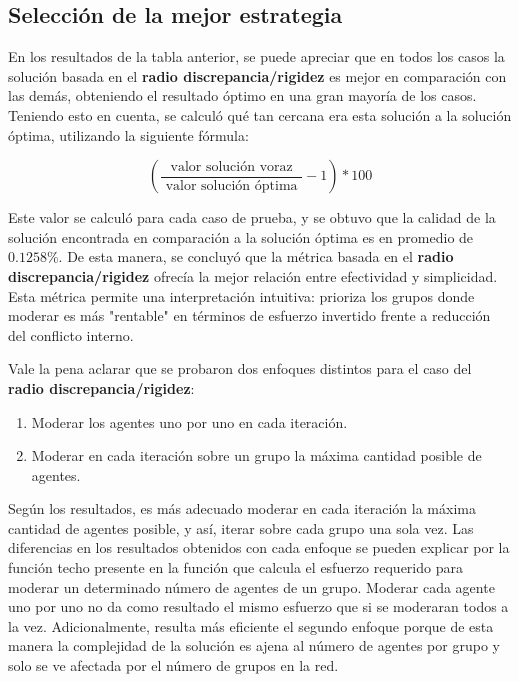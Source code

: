 \subsection{Selección de la mejor estrategia}

En los resultados de la tabla anterior, se puede apreciar que en todos los casos la solución basada en el \textbf{radio discrepancia/rigidez} es mejor en comparación con las demás, obteniendo el resultado óptimo en una gran mayoría de los casos. Teniendo esto en cuenta, se calculó qué tan cercana era esta solución a la solución óptima, utilizando la siguiente fórmula:

\begin{equation}
	\left ( \frac{ \text{ valor solución voraz } }{ \text{ valor solución óptima }} - 1 \right ) * 100
\end{equation}


Este valor se calculó para cada caso de prueba, y se obtuvo que la calidad de la solución encontrada en comparación a la solución óptima es en promedio de $0.1258 \%$. De esta manera, se concluyó que la métrica basada en el \textbf{radio discrepancia/rigidez} ofrecía la mejor relación entre efectividad y simplicidad. Esta métrica permite una interpretación intuitiva: prioriza los grupos donde moderar es más "rentable" en términos de esfuerzo invertido frente a reducción del conflicto interno.

Vale la pena aclarar que se probaron dos enfoques distintos para el caso del \textbf{radio discrepancia/rigidez}:

\begin{enumerate}
	\item Moderar los agentes uno por uno en cada iteración.

	\item Moderar en cada iteración sobre un grupo la máxima cantidad posible de agentes.
\end{enumerate}

Según los resultados, es más adecuado moderar en cada iteración la máxima cantidad de agentes posible, y así, iterar sobre cada grupo una sola vez. Las diferencias en los resultados obtenidos con cada enfoque se pueden explicar por la función techo presente en la función que calcula el esfuerzo requerido para moderar un determinado número de agentes de un grupo. Moderar cada agente uno por uno no da como resultado el mismo esfuerzo que si se moderaran todos a la vez. Adicionalmente, resulta más eficiente el segundo enfoque porque de esta manera la complejidad de la solución es ajena al número de agentes por grupo y solo se ve afectada por el número de grupos en la red.

